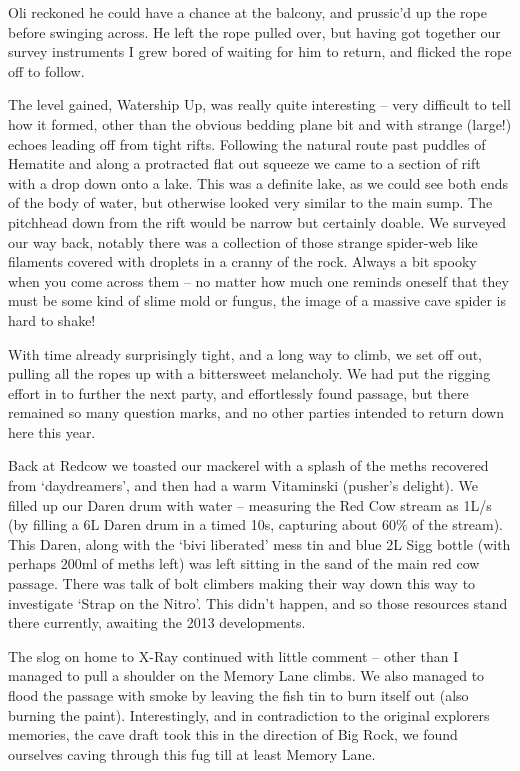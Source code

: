 Oli reckoned he could have a chance at the balcony, and prussic'd up the
rope before swinging across. He left the rope pulled over, but having
got together our survey instruments I grew bored of waiting for him to
return, and flicked the rope off to follow.

The level gained, Watership Up, was really quite interesting -- very
difficult to tell how it formed, other than the obvious bedding plane
bit and with strange (large!) echoes leading off from tight rifts.
Following the natural route past puddles of Hematite and along a
protracted flat out squeeze we came to a section of rift with a drop
down onto a lake. This was a definite lake, as we could see both ends of
the body of water, but otherwise looked very similar to the main sump.
The pitchhead down from the rift would be narrow but certainly doable.
We surveyed our way back, notably there was a collection of those
strange spider-web like filaments covered with droplets in a cranny of
the rock. Always a bit spooky when you come across them -- no matter how
much one reminds oneself that they must be some kind of slime mold or
fungus, the image of a massive cave spider is hard to shake!

With time already surprisingly tight, and a long way to climb, we set
off out, pulling all the ropes up with a bittersweet melancholy. We had
put the rigging effort in to further the next party, and effortlessly
found passage, but there remained so many question marks, and no other
parties intended to return down here this year.

Back at Redcow we toasted our mackerel with a splash of the meths
recovered from `daydreamers', and then had a warm Vitaminski (pusher's
delight). We filled up our Daren drum with water -- measuring the Red
Cow stream as 1L/s (by filling a 6L Daren drum in a timed 10s, capturing
about 60\% of the stream). This Daren, along with the `bivi liberated'
mess tin and blue 2L Sigg bottle (with perhaps 200ml of meths left) was
left sitting in the sand of the main red cow passage. There was talk of
bolt climbers making their way down this way to investigate `Strap on
the Nitro'. This didn't happen, and so those resources stand there
currently, awaiting the 2013 developments.

The slog on home to X-Ray continued with little comment -- other than I
managed to pull a shoulder on the Memory Lane climbs. We also managed to
flood the passage with smoke by leaving the fish tin to burn itself out
(also burning the paint). Interestingly, and in contradiction to the
original explorers memories, the cave draft took this in the direction
of Big Rock, we found ourselves caving through this fug till at least
Memory Lane.

